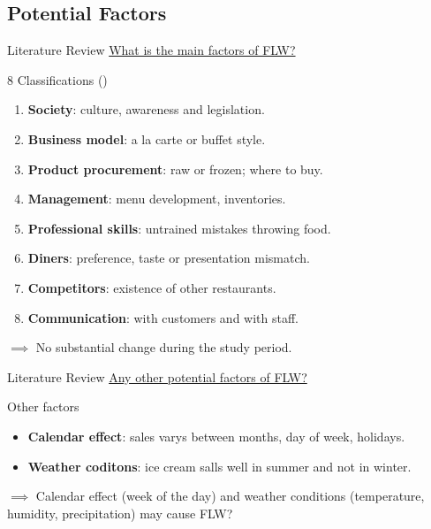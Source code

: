 \documentclass{beamer}
\begin{document}
\subsection{Potential Factors}
\begin{frame}{Literature Review}
    \underline{What is the main factors of FLW?}
    \begin{block}{8 Classifications (\cite{Heikkila2016-el})}
        \begin{enumerate}
            \item \textbf{Society}: \small culture, awareness and legislation.
            \item \textbf{Business model}: \small a la carte or buffet style.
            \item \textbf{Product procurement}: \small raw or frozen; where to buy.
            \item \textbf{Management}: \small menu development, inventories.
            \item \textbf{Professional skills}: \small untrained mistakes throwing food.
            \item \textbf{Diners}: \small preference, taste or presentation mismatch.
            \item \textbf{Competitors}: \small existence of other restaurants.
            \item \textbf{Communication}: \small with customers and with staff.
        \end{enumerate}
    \end{block}
    $\implies$ No substantial change during the study period.
\end{frame}

\begin{frame}{Literature Review}
    \underline{Any other potential factors of FLW?}
    \begin{block}{Other factors}
        \begin{itemize}
            \item \textbf{Calendar effect}: sales varys between months, day of week, holidays.
            \item \textbf{Weather coditons}: ice cream salls well in summer and not in winter.
        \end{itemize}       
    \end{block}
    $\implies$ Calendar effect (week of the day) and weather conditions (temperature, humidity, precipitation) may cause FLW?
\end{frame}
\end{document}
